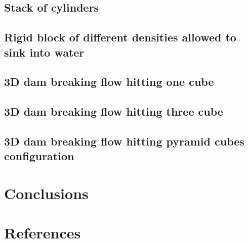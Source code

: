 \documentclass[preprint,12pt]{elsarticle}
\begin{document}
\subsection{Stack of cylinders}
\label{sec:stack-of-cylinders}



\subsection{Rigid block of different densities allowed to sink into water}
\label{sec:rigid-block-diff}



\subsection{3D dam breaking flow hitting one cube}
\label{sec:3d-dam-breaking-one-cube-hit}

\cite{amaro2019improvement}

\subsection{3D dam breaking flow hitting three cube}
\label{sec:3d-dam-breaking-one-cube-hit}

\cite{amaro2019improvement}

\subsection{3D dam breaking flow hitting pyramid cubes configuration}
\label{sec:3d-dam-breaking-one-cube-hit}

\cite{amaro2019improvement}








\section{Conclusions}
\label{sec:conclusions}

\section*{References}


\end{document}
